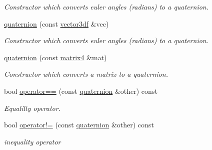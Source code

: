 \begin{DoxyCompactItemize}
\begin{DoxyCompactList}\small\item\em Constructor which converts euler angles (radians) to a quaternion. \end{DoxyCompactList}\item 
\mbox{\label{classirr_1_1core_1_1quaternion_af8d613780a8d0e3f2775f6f9086db3b0}} 
\hyperlink{classirr_1_1core_1_1quaternion_af8d613780a8d0e3f2775f6f9086db3b0}{quaternion} (const \hyperlink{namespaceirr_1_1core_ae6e2b2a6c552833ebbd5b7463d03586b}{vector3df} \&vec)
\begin{DoxyCompactList}\small\item\em Constructor which converts euler angles (radians) to a quaternion. \end{DoxyCompactList}\item 
\mbox{\label{classirr_1_1core_1_1quaternion_a60b4e1a97224c18da64e49861b8d0107}} 
\hyperlink{classirr_1_1core_1_1quaternion_a60b4e1a97224c18da64e49861b8d0107}{quaternion} (const \hyperlink{namespaceirr_1_1core_a4c9d4e29899535971052810954a14431}{matrix4} \&mat)
\begin{DoxyCompactList}\small\item\em Constructor which converts a matrix to a quaternion. \end{DoxyCompactList}\item 
\mbox{\label{classirr_1_1core_1_1quaternion_a73a513d1c05be8c3007bf7f615b92dd4}} 
bool \hyperlink{classirr_1_1core_1_1quaternion_a73a513d1c05be8c3007bf7f615b92dd4}{operator==} (const \hyperlink{classirr_1_1core_1_1quaternion}{quaternion} \&other) const
\begin{DoxyCompactList}\small\item\em Equalilty operator. \end{DoxyCompactList}\item 
\mbox{\label{classirr_1_1core_1_1quaternion_a5438edad0c932d06d6f23651903fed83}} 
bool \hyperlink{classirr_1_1core_1_1quaternion_a5438edad0c932d06d6f23651903fed83}{operator!=} (const \hyperlink{classirr_1_1core_1_1quaternion}{quaternion} \&other) const
\begin{DoxyCompactList}\small\item\em inequality operator \end{DoxyCompactList}\item 

\end{DoxyCompactItemize}
